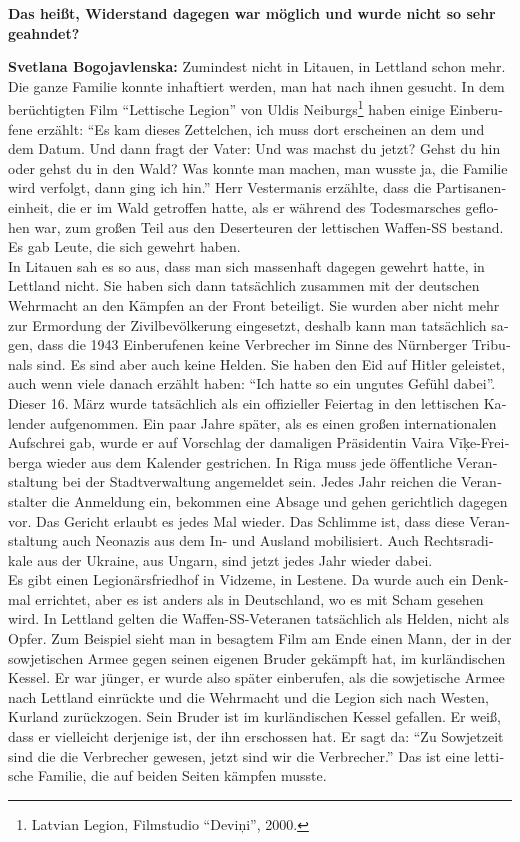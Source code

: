 \begin{otherlanguage}{ngerman}
\textbf{Das heißt, Widerstand dagegen war möglich und wurde nicht so sehr geahndet?}

\textbf{Svetlana Bogojavlenska:} Zumindest nicht in Litauen, in Lettland schon mehr. Die ganze Familie konnte inhaftiert werden, man hat nach ihnen gesucht. In dem berüchtigten Film "`Lettische Legion"' von Uldis Neiburgs\footnote{Latvian Legion, Filmstudio "`Deviņi"', 2000.} haben einige Einberufene erzählt: "`Es kam dieses Zettelchen, ich muss dort erscheinen an dem und dem Datum. Und dann fragt der Vater: \glq Und was machst du jetzt? Gehst du hin oder gehst du in den Wald?\grq{} Was konnte man machen, man wusste ja, die Familie wird verfolgt, dann ging ich hin."' Herr Vestermanis erzählte, dass die Partisaneneinheit, die er im Wald getroffen hatte, als er während des Todesmarsches geflohen war, zum großen Teil aus den Deserteuren der lettischen Waffen-SS bestand. Es gab Leute, die sich gewehrt haben.\\ 
In Litauen sah es so aus, dass man sich massenhaft dagegen gewehrt hatte, in Lettland nicht. Sie haben sich dann tatsächlich zusammen mit der deutschen Wehrmacht an den Kämpfen an der Front beteiligt. Sie wurden aber nicht mehr zur Ermordung der Zivilbevölkerung eingesetzt, deshalb kann man tatsächlich sagen, dass die 1943 Einberufenen keine Verbrecher im Sinne des Nürnberger Tribunals sind. Es sind aber auch keine Helden. Sie haben den Eid auf Hitler geleistet, auch wenn viele danach erzählt haben: "`Ich hatte so ein ungutes Gefühl dabei"'.\\ 
Dieser 16. März wurde tatsächlich als ein offizieller Feiertag in den lettischen Kalender aufgenommen. Ein paar Jahre später, als es einen großen internationalen Aufschrei gab, wurde er auf Vorschlag der damaligen Präsidentin Vaira Vīķe-Freiberga wieder aus dem Kalender gestrichen. In Riga muss jede öffentliche Veranstaltung bei der Stadtverwaltung angemeldet sein. Jedes Jahr reichen die Veranstalter die Anmeldung ein, bekommen eine Absage und gehen gerichtlich dagegen vor. Das Gericht erlaubt es jedes Mal wieder. Das Schlimme ist, dass diese Veranstaltung auch Neonazis aus dem In- und Ausland mobilisiert. Auch Rechtsradikale aus der Ukraine, aus Ungarn, sind jetzt jedes Jahr wieder dabei.\\
Es gibt einen Legionärsfriedhof in Vidzeme, in Lestene. Da wurde auch ein Denkmal errichtet, aber es ist anders als in Deutschland, wo es mit Scham gesehen wird. In Lettland gelten die Waffen-SS-Veteranen tatsächlich als Helden, nicht als Opfer. Zum Beispiel sieht man in besagtem Film am Ende einen Mann, der in der sowjetischen Armee gegen seinen eigenen Bruder gekämpft hat, im kurländischen Kessel. Er war jünger, er wurde also später einberufen, als die sowjetische Armee nach Lettland einrückte und die Wehrmacht und die Legion sich nach Westen, Kurland zurückzogen. Sein Bruder ist im kurländischen Kessel gefallen. Er weiß, dass er vielleicht derjenige ist, der ihn erschossen hat. Er sagt da: "`Zu Sowjetzeit sind die die Verbrecher gewesen, jetzt sind wir die Verbrecher."' Das ist eine lettische Familie, die auf beiden Seiten kämpfen musste.\\

\end{otherlanguage}
